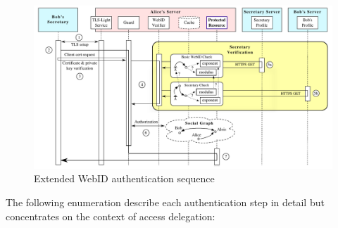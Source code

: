 \documentclass[a4paper]{llncs}
\begin{document}
\begin{figure}[htb]
  \centering
  \includegraphics[width=\textwidth]{AuthSequence}
  \caption{Extended WebID authentication sequence}
  \label{fig:AuthSequence}
\end{figure}

The following enumeration describe each authentication step in detail but concentrates on the context of access delegation:
\end{document}
